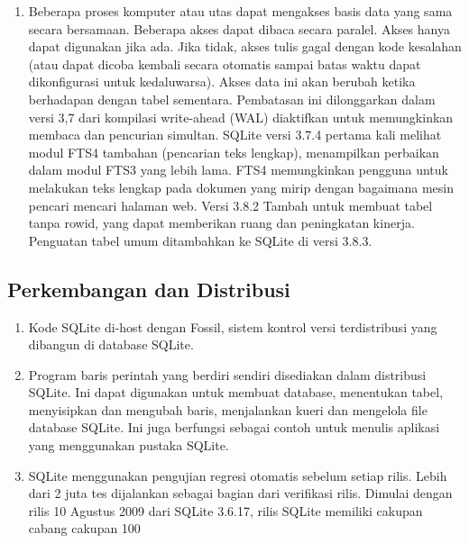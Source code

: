 \begin{enumerate}
			\item Beberapa proses komputer atau utas dapat mengakses basis data yang sama secara bersamaan. Beberapa akses dapat dibaca secara paralel. Akses hanya dapat digunakan jika ada. Jika tidak, akses tulis gagal dengan kode kesalahan (atau dapat dicoba kembali secara otomatis sampai batas waktu dapat dikonfigurasi untuk kedaluwarsa). Akses data ini akan berubah ketika berhadapan dengan tabel sementara. Pembatasan ini dilonggarkan dalam versi 3,7 dari kompilasi write-ahead (WAL) diaktifkan untuk memungkinkan membaca dan pencurian simultan. SQLite versi 3.7.4 pertama kali melihat modul FTS4 tambahan (pencarian teks lengkap), menampilkan perbaikan dalam modul FTS3 yang lebih lama. FTS4 memungkinkan pengguna untuk melakukan teks lengkap pada dokumen yang mirip dengan bagaimana mesin pencari mencari halaman web. Versi 3.8.2 Tambah untuk membuat tabel tanpa rowid, yang dapat memberikan ruang dan peningkatan kinerja. Penguatan tabel umum ditambahkan ke SQLite di versi 3.8.3.
		\end{enumerate}
	\subsection{Perkembangan dan Distribusi}
		\begin{enumerate}
			\item Kode SQLite di-host dengan Fossil, sistem kontrol versi terdistribusi yang dibangun di database SQLite.
			\item Program baris perintah yang berdiri sendiri disediakan dalam distribusi SQLite. Ini dapat digunakan untuk membuat database, menentukan tabel, menyisipkan dan mengubah baris, menjalankan kueri dan mengelola file database SQLite. Ini juga berfungsi sebagai contoh untuk menulis aplikasi yang menggunakan pustaka SQLite.
			\item SQLite menggunakan pengujian regresi otomatis sebelum setiap rilis. Lebih dari 2 juta tes dijalankan sebagai bagian dari verifikasi rilis. Dimulai dengan rilis 10 Agustus 2009 dari SQLite 3.6.17, rilis SQLite memiliki cakupan cabang cakupan 100%
		\end{enumerate}
